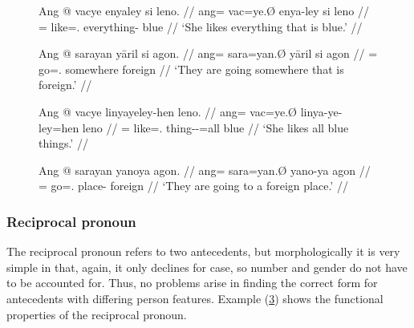\begin{figure}
\pex\label{ex:indefproadjpc}
\a\begingl
	\gla Ang @ vacye enyaley si leno. //
	\glb ang= vac=ye.Ø enya-ley si leno //
	\glc \AgtT{}= like=\TsgF{}.\Top{} everything-\PargI{} \Rel{} blue //
	\glft `She likes everything that is blue.' //
\endgl

\a\begingl
	\gla Ang @ sarayan yāril si agon. //
	\glb ang= sara=yan.Ø yāril si agon //
	\glc \AgtT{}= go=\TplM{}.\Top{} somewhere \Rel{} foreign //
	\glft `They are going somewhere that is foreign.' //
\endgl
\xe
\end{figure}

\begin{figure}
\pex\label{ex:indefproadjgennoun}
\a\begingl
	\gla Ang @ vacye linyayeley-hen leno. //
	\glb ang= vac=ye.Ø linya-ye-ley=hen leno //
	\glc \AgtT{}= like=\TsgF{}.\Top{} thing-\Pl{}-\PargI{}=all blue //
	\glft `She likes all blue things.' //
\endgl

\a\begingl
	\gla Ang @ sarayan yanoya agon. //
	\glb ang= sara=yan.Ø yano-ya agon //
	\glc \AgtT{}= go=\TplM{}.\Top{} place-\Loc{} foreign //
	\glft `They are going to a foreign place.' //
\endgl
\xe
\end{figure}


\subsubsection{Reciprocal pronoun}

The reciprocal pronoun  refers to two
antecedents, but morphologically it is very simple in that, again, it only
declines for case, so number and gender do not have to be accounted for. Thus,
no problems arise in finding the correct form for antecedents with differing
person features. Example (\ref{ex:recpromorphlex}) shows the functional
properties of the reciprocal pronoun.

\begin{figure}[h]
\begin{morphlex}
\ex\label{ex:recpromorphlex}
\xe
\end{morphlex}
\end{figure}

